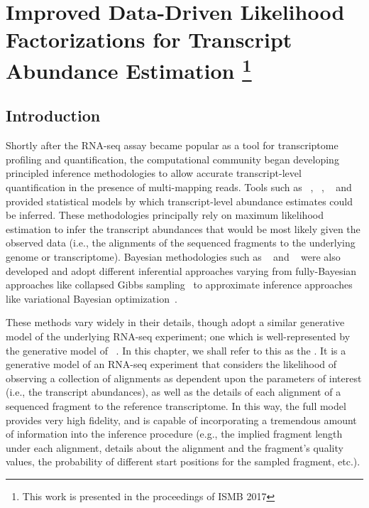 
\renewcommand{\thechapter}{3}

\chapter[Data-Driven Likelihood Factorizations]{Improved Data-Driven 
Likelihood Factorizations for Transcript Abundance Estimation
\footnote{This work is presented in the proceedings of ISMB 2017}} 
\label{chapt3}

\section{Introduction}

Shortly after the RNA-seq assay became popular as a tool for transcriptome profiling and 
quantification, the computational community began developing principled inference 
methodologies to allow accurate transcript-level quantification in the presence of 
multi-mapping reads.  Tools such as \cufflinks~\citep{cufflinks}, \rsem~\citep{Li2010RSEM}, 
\mmseq~\citep{Turro2011Haplotype} and \isoem~\citep{Nicolae2011Estimation} provided 
statistical models by which transcript-level abundance estimates could be inferred. 
These methodologies principally rely on maximum likelihood estimation to infer the 
transcript abundances that would be most likely given the observed data (i.e., the 
alignments of the sequenced fragments to the underlying genome or transcriptome). 
Bayesian methodologies such as \bitseq~\citep{bitseq} and \tigar~\citep{tigar} were 
also developed and adopt different inferential approaches varying from fully-Bayesian 
approaches like collapsed Gibbs sampling~\citep{bitseq} to approximate inference 
approaches like variational Bayesian optimization~\citep{tigar,tigar2,bitseqvb}.

These methods vary widely in their details, though adopt a similar 
generative model of the underlying RNA-seq experiment; one which is well-represented 
by the generative model of \rsem~\citep{Li2010RSEM,rsembmc}.  In this chapter, we shall 
refer to this as the \fm.  It is a generative model of an RNA-seq experiment that 
considers the likelihood of observing a collection of alignments as dependent upon 
the parameters of interest (i.e., the transcript abundances), as well as the details 
of each alignment of a sequenced fragment to the reference transcriptome.  In this way, 
the full model provides very high fidelity, and is capable of incorporating a tremendous 
amount of information into the inference procedure (e.g., the implied fragment length 
under each alignment, details about the alignment and the fragment's quality values, 
the probability of different start positions for the sampled fragment, etc.).

